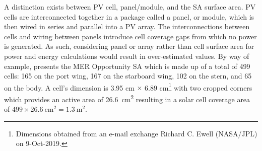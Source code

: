 A distinction exists between \ac{PV} cell, panel/module, and the \ac{SA} surface area. \ac{PV} cells are interconnected together in a package called a panel, or module, which is then wired in series and parallel into a \ac{PV} array. The interconnections between cells and wiring between panels introduce cell coverage gaps from which no power is generated. As such, considering panel or array rather than cell surface area for power and energy calculations would result in over-estimated values. By way of example,  presents the \ac{MER} Opportunity \ac{SA} which is made up of a total of 499 cells: 165 on the port wing, 167 on the starboard wing, 102 on the stern, and 65 on the body. A cell's dimension is 3.95 \si{\centi\meter} $\times$  6.89 \si{\centi\meter}\footnote{Dimensions obtained from an e-mail exchange Richard C. Ewell (NASA/JPL) on 9-Oct-2019.} with two cropped corners which provides an active area of \SI{26.6}{\centi\meter\squared} resulting in a solar cell coverage area of $499 \times \SI{26.6}{\centi\meter\squared} = \SI{1.3}{\meter\squared}$.


